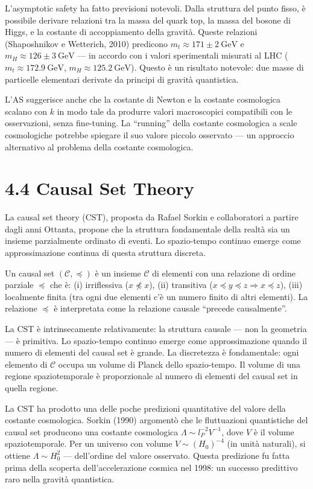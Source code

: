\documentclass[11.5pt,a4paper,openany]{book}
\theoremstyle{remark}
\begin{document}
L'asymptotic safety ha fatto previsioni notevoli. Dalla struttura del punto fisso, è possibile derivare relazioni tra la massa del quark top, la massa del bosone di Higgs, e la costante di accoppiamento della gravità. Queste relazioni (Shaposhnikov e Wetterich, 2010) predicono $m_t \approx 171 \pm 2\ \text{GeV}$ e $m_H \approx 126 \pm 3\ \text{GeV}$ --- in accordo con i valori sperimentali misurati al LHC ($m_t \approx 172.9\ \text{GeV}$, $m_H \approx 125.2\ \text{GeV}$). Questo è un risultato notevole: due masse di particelle elementari derivate da principi di gravità quantistica.

L'AS suggerisce anche che la costante di Newton e la costante cosmologica scalano con $k$ in modo tale da produrre valori macroscopici compatibili con le osservazioni, senza fine-tuning. La ``running'' della costante cosmologica a scale cosmologiche potrebbe spiegare il suo valore piccolo osservato --- un approccio alternativo al problema della costante cosmologica.

\section{4.4 Causal Set Theory}

La causal set theory (CST), proposta da Rafael Sorkin e collaboratori a partire dagli anni Ottanta, propone che la struttura fondamentale della realtà sia un insieme parzialmente ordinato di eventi. Lo spazio-tempo continuo emerge come approssimazione continua di questa struttura discreta.

Un causal set $(\mathcal{C}, \preceq)$ è un insieme $\mathcal{C}$ di elementi con una relazione di ordine parziale $\preceq$ che è: (i) irriflessiva ($x \not\preceq x$), (ii) transitiva ($x \preceq y \preceq z \Rightarrow x \preceq z$), (iii) localmente finita (tra ogni due elementi c'è un numero finito di altri elementi). La relazione $\preceq$ è interpretata come la relazione causale ``precede causalmente''.

La CST è intrinsecamente relativamente: la struttura causale --- non la geometria --- è primitiva. Lo spazio-tempo continuo emerge come approssimazione quando il numero di elementi del causal set è grande. La discretezza è fondamentale: ogni elemento di $\mathcal{C}$ occupa un volume di Planck dello spazio-tempo. Il volume di una regione spaziotemporale è proporzionale al numero di elementi del causal set in quella regione.

La CST ha prodotto una delle poche predizioni quantitative del valore della costante cosmologica. Sorkin (1990) argomentò che le fluttuazioni quantistiche del causal set producono una costante cosmologica $\Lambda \sim l_P^{-2} V^{-1}$, dove $V$ è il volume spaziotemporale. Per un universo con volume $V \sim (H_0)^{-4}$ (in unità naturali), si ottiene $\Lambda \sim H_0^2$ --- dell'ordine del valore osservato. Questa predizione fu fatta prima della scoperta dell'accelerazione cosmica nel 1998: un successo predittivo raro nella gravità quantistica.
\end{document}
